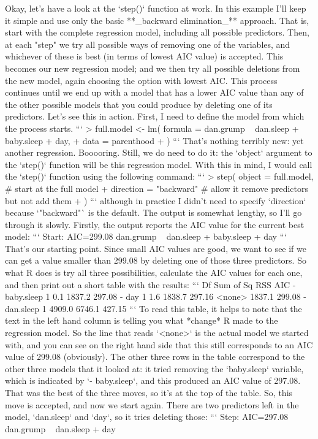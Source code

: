Okay, let's have a look at the `step()` function at work. In this example I'll keep it simple and use only the basic **_backward elimination_** approach. That is, start with the complete regression model, including all possible predictors. Then, at each "step" we try all possible ways of removing one of the variables, and whichever of these is best (in terms of lowest AIC value) is accepted. This becomes our new regression model; and we then try all possible deletions from the new model, again choosing the option with lowest AIC. This process continues until we end up with a model that has a lower AIC value than any of the other possible models that you could produce by deleting one of its predictors. Let's see this in action. First, I need to define the model from which the process starts. 
```
> full.model <- lm( formula = dan.grump ~ dan.sleep + baby.sleep + day,  
+                   data = parenthood  
+ )
```
That's nothing terribly new: yet another regression. Booooring. Still, we do need to do it: the `object` argument to the `step()` function will be this regression model. With this in mind, I would call the `step()` function using the following command:
```
> step( object = full.model,     # start at the full model
+       direction = "backward"   # allow it remove predictors but not add them
+ )
```
although in practice I didn't need to specify `direction` because `"backward"` is the default. The output is somewhat lengthy, so I'll go through it slowly. Firstly, the output reports the AIC value for the current best model:
```
Start:  AIC=299.08
dan.grump ~ dan.sleep + baby.sleep + day
```
That's our starting point. Since small AIC values are good, we want to see if we can get a value smaller than 299.08 by deleting one of those three predictors. So what R does is try all three possibilities, calculate the AIC values for each one, and then print out a short table with the results:
```
             Df Sum of Sq    RSS    AIC
- baby.sleep  1       0.1 1837.2 297.08
- day         1       1.6 1838.7 297.16
<none>                    1837.1 299.08
- dan.sleep   1    4909.0 6746.1 427.15
```
To read this table, it helps to note that the text in the left hand column is telling you what *change* R made to the regression model. So the line that reads `<none>` is the actual model we started with, and you can see on the right hand side that this still corresponds to an AIC value of 299.08 (obviously). The other three rows in the table correspond to the other three models that it looked at: it tried removing the `baby.sleep` variable, which is indicated by `- baby.sleep`, and this produced an AIC value of 297.08. That was the best of the three moves, so it's at the top of the table. So, this move is accepted, and now we start again. There are two predictors left in the model, `dan.sleep` and `day`, so it tries deleting those:
```
Step:  AIC=297.08
dan.grump ~ dan.sleep + day

